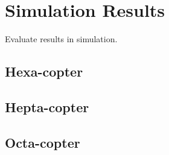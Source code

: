 \chapter{Simulation Results}
\label{sec:simulation_results}
Evaluate results in simulation.

\section{Hexa-copter}
\label{sec:hexa_copter_sim}

\section{Hepta-copter}
\label{sec:hepta_copter_sim}

\section{Octa-copter}
\label{sec:octa_copter_sim}
